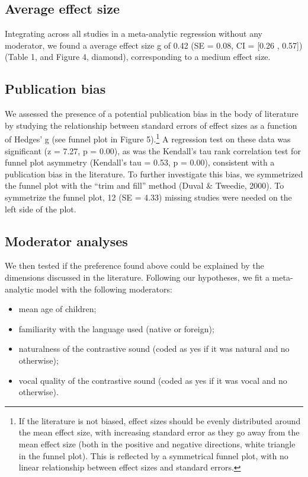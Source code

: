 \documentclass[man]{apa6}
\providecommand{\tightlist}{%
  \setlength{\itemsep}{0pt}\setlength{\parskip}{0pt}}
\begin{document}
\hypertarget{average-effect-size}{%
\subsection{Average effect size}\label{average-effect-size}}

Integrating across all studies in a meta-analytic regression without any moderator, we found a average effect size g of 0.42 (SE = 0.08, CI = {[}0.26 , 0.57{]}) (Table 1, and Figure 4, diamond), corresponding to a medium effect size.

\hypertarget{publication-bias}{%
\subsection{Publication bias}\label{publication-bias}}

We assessed the presence of a potential publication bias in the body of literature by studying the relationship between standard errors of effect sizes as a function of Hedges' g (see funnel plot in Figure 5).\footnote{If the literature is not biased, effect sizes should be evenly distributed around the mean effect size, with increasing standard error as they go away from the mean effect size (both in the positive and negative directions, white triangle in the funnel plot). This is reflected by a symmetrical funnel plot, with no linear relationship between effect sizes and standard errors.} A regression test on these data was significant (z = 7.27, p = 0.00), as was the Kendall's tau rank correlation test for funnel plot asymmetry (Kendall's tau = 0.53, p = 0.00), consistent with a publication bias in the literature.
To further investigate this bias, we symmetrized the funnel plot with the \enquote{trim and fill} method (Duval \& Tweedie, 2000). To symmetrize the funnel plot, 12 (SE = 4.33) missing studies were needed on the left side of the plot.

\hypertarget{moderator-analyses}{%
\subsection{Moderator analyses}\label{moderator-analyses}}

We then tested if the preference found above could be explained by the dimensions discussed in the literature. Following our hypotheses, we fit a meta-analytic model with the following moderators:

\begin{itemize}
\tightlist
\item
  mean age of children;
\item
  familiarity with the language used (native or foreign);
\item
  naturalness of the contrastive sound (coded as yes if it was natural and no otherwise);
\item
  vocal quality of the contrastive sound (coded as yes if it was vocal and no otherwise).
\end{itemize}
\end{document}
